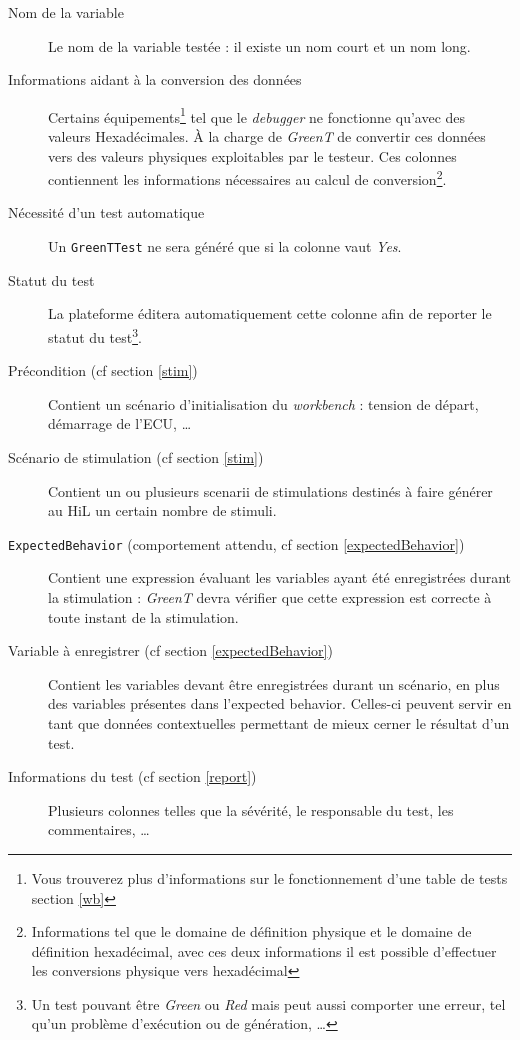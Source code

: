 \begin{description} 
	\item[Nom de la variable] Le nom de la variable testée : il existe un nom court et un nom long.
	\item[Informations aidant à la conversion des données] Certains équipements\footnote{Vous trouverez plus d'informations sur le fonctionnement d'une table de tests section \ref{wb}} tel que le \textit{debugger} ne fonctionne qu'avec des
	valeurs Hexadécimales. À la charge de \textit{GreenT} de convertir ces données vers des valeurs physiques exploitables par
	le testeur. Ces colonnes contiennent les informations nécessaires au calcul de conversion\footnote{Informations tel que le
		domaine de définition physique et le domaine de définition hexadécimal, avec ces deux informations il est possible d'effectuer les conversions physique vers hexadécimal}.
	\item[Nécessité d'un test automatique] Un \texttt{GreenTTest} ne sera généré que si la colonne vaut \textit{Yes}.
	\item[Statut du test] La plateforme éditera automatiquement cette colonne afin de reporter le statut du test\footnote{Un test pouvant être \textit{Green} ou \textit{Red}
		mais peut aussi comporter une erreur, tel qu'un problème d'exécution ou de génération, \ldots}.
	\item[Précondition (cf section \ref{stim})] Contient un scénario d'initialisation du \textit{workbench} : tension de départ,
	démarrage de l'ECU, \ldots
	\item[Scénario de stimulation (cf section \ref{stim})] Contient un ou plusieurs scenarii de stimulations destinés à faire générer au HiL un certain nombre de stimuli.
	\item[\texttt{ExpectedBehavior} (comportement attendu, cf section \ref{expectedBehavior})] Contient une expression évaluant les variables ayant été enregistrées durant la stimulation : \textit{GreenT} devra vérifier que cette expression est correcte à toute instant de la stimulation.
	\item[Variable à enregistrer (cf section \ref{expectedBehavior})] Contient les variables devant être enregistrées durant un
	scénario, en plus des variables présentes dans l'expected behavior. Celles-ci peuvent servir en tant que données
	contextuelles permettant de mieux cerner le résultat d'un test.
	\item[Informations du test (cf section \ref{report})] Plusieurs colonnes telles que la sévérité, le responsable du test, les commentaires, \ldots
\end{description}


